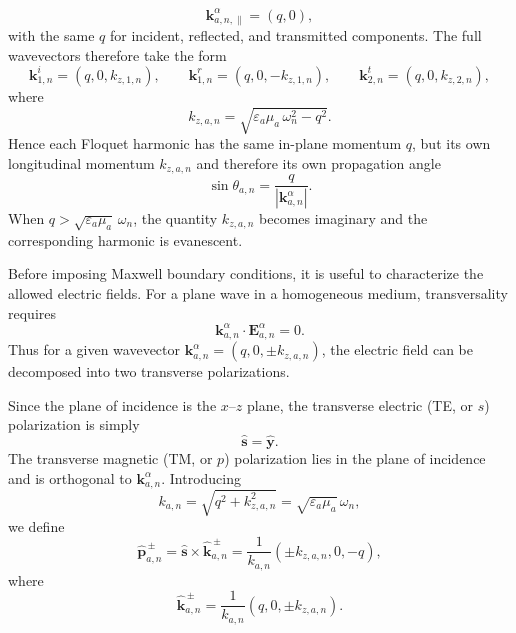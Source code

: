 \documentclass[aps, prb, superscriptaddress, longbibliography]{revtex4-2}
\renewcommand{\epsilon}{\varepsilon}
\numberwithin{equation}{section}
\begin{document}
\begin{equation}
\mathbf k^\alpha_{a,n,\parallel}=(q,0),
\end{equation}
with the same $q$ for incident, reflected, and transmitted components. The full wavevectors therefore take the form
\begin{equation}
\mathbf k^i_{1,n}=(q,0,k_{z,1,n}),\qquad
\mathbf k^r_{1,n}=(q,0,-k_{z,1,n}),\qquad
\mathbf k^t_{2,n}=(q,0,k_{z,2,n}),
\end{equation}
where
\begin{equation}
k_{z,a,n}=\sqrt{\epsilon_a\mu_a\,\omega_n^2-q^2}.
\end{equation}
Hence each Floquet harmonic has the same in-plane momentum $q$, but its own longitudinal momentum $k_{z,a,n}$ and therefore its own propagation angle
\begin{equation}
\sin\theta_{a,n}=\frac{q}{|\mathbf k^\alpha_{a,n}|}.
\end{equation}
When $q>\sqrt{\epsilon_a\mu_a}\,\omega_n$, the quantity $k_{z,a,n}$ becomes imaginary and the corresponding harmonic is evanescent.

Before imposing Maxwell boundary conditions, it is useful to characterize the allowed electric fields. For a plane wave in a homogeneous medium, transversality requires
\begin{equation}
\mathbf k^\alpha_{a,n}\cdot \mathbf E^\alpha_{a,n}=0.
\end{equation}
Thus for a given wavevector $\mathbf k^\alpha_{a,n}=(q,0,\pm k_{z,a,n})$, the electric field can be decomposed into two transverse polarizations.

Since the plane of incidence is the $x$--$z$ plane, the transverse electric (TE, or $s$) polarization is simply
\begin{equation}
\hat{\mathbf s}=\hat{\mathbf y}.
\end{equation}
The transverse magnetic (TM, or $p$) polarization lies in the plane of incidence and is orthogonal to $\mathbf k^\alpha_{a,n}$. Introducing
\begin{equation}
k_{a,n}=\sqrt{q^2+k_{z,a,n}^2}=\sqrt{\epsilon_a\mu_a}\,\omega_n,
\end{equation}
we define
\begin{equation}
\hat{\mathbf p}^{\,\pm}_{a,n}
=
\hat{\mathbf s}\times \hat{\mathbf k}^{\,\pm}_{a,n}
=
\frac{1}{k_{a,n}}(\pm k_{z,a,n},0,-q),
\end{equation}
where
\begin{equation}
\hat{\mathbf k}^{\,\pm}_{a,n}=\frac{1}{k_{a,n}}(q,0,\pm k_{z,a,n}).
\end{equation}
\end{document}
